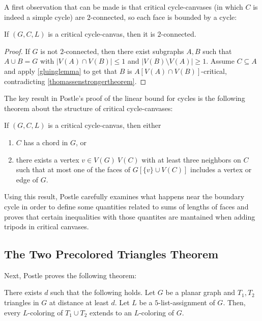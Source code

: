 A first observation that can be made is that critical cycle-canvases (in which $C$ is indeed a simple cycle) are $2$-connected, so each face is bounded by a cycle:

\begin{lemma}
If $(G, C, L)$ is a critical cycle-canvas, then it is $2$-connected.
\end{lemma}

\begin{proof}
If $G$ is not $2$-connected, then there exist subgraphs $A, B$ such that $A \cup B = G$ with $|V(A) \cap V(B)| \leq 1$ and $|V(B) \setminus V(A)| \geq 1$. Assume $C \subseteq A$ and apply \ref{gluinglemma} to get that $B$ is $A[V(A) \cap V(B)]$-critical, contradicting \ref{thomassenstrongertheorem}.
\end{proof}

The key result in Postle's proof of the linear bound for cycles is the following theorem about the structure of critical cycle-canvases:

\begin{theorem}
\label{cyclechordtripodtheorem}
If $(G, C, L)$ is a critical cycle-canvas, then either

\begin{enumerate}
\item $C$ has a chord in $G$, or
\item there exists a vertex $v \in V(G) \ V(C)$ with at least three neighbors on $C$ such that at most one of the faces of $G[\{v\} \cup V(C)]$ includes a vertex or edge of $G$. 
\end{enumerate}
\end{theorem}

Using this result, Postle carefully examines what happens near the boundary cycle in order to define some quantities related to sums of lengths of faces and proves that certain inequalities with those quantites are mantained when adding tripods in critical canvases. 



\subsection{The Two Precolored Triangles Theorem}

Next, Postle proves the following theorem:

\begin{theorem}
	There exists $d$ such that the following holds.
	Let $G$ be a planar graph and $T_1, T_2$ triangles in $G$ at distance at least $d$. Let $L$ be a $5$-list-assignment of $G$. Then, every $L$-coloring of $T_1 \cup T_2$ extends to an $L$-coloring of $G$.
\end{theorem}

